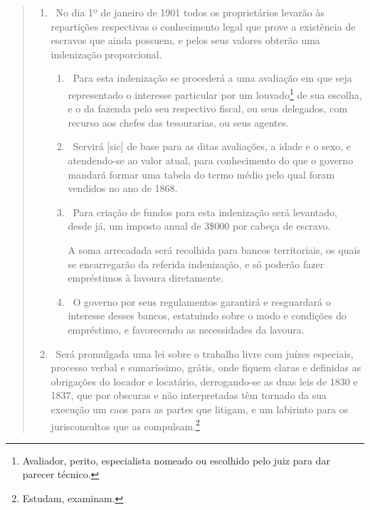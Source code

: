 \begin{quote}
\begin{enumerate}[label=Art. \arabic*º]
\begin{enumerate}[label=§ \arabic*º]
\item\ O proprietário que, dando parte do emancipamento\footnote{O
  mesmo que emancipação.} de um escravo, mostrar que o libertou na pia
batismal, poderá gozar de seus serviços até a idade de 15 anos, sendo,
porém, obrigado a mandar-lhe ensinar, escrever e contar.
\end{enumerate}

\item\ No dia 1º de janeiro de 1901 todos os proprietários levarão às
repartições respectivas o conhecimento legal que prove a existência de
escravos que ainda possuem, e pelos seus valores obterão uma indenização
proporcional.

\begin{enumerate}[label=§ \arabic*º]
\item\ Para esta indenização se procederá a uma avaliação em que seja
representado o interesse particular por um louvado\footnote{Avaliador,
  perito, especialista nomeado ou escolhido pelo juiz para dar parecer
  técnico.} de sua escolha, e o da fazenda pelo seu respectivo fiscal,
ou seus delegados, com recurso aos chefes das tesourarias, ou seus
agentes.

\item\ Servirá {[}sic{]} de base para as ditas avaliações, a idade e o
sexo, e atendendo-se ao valor atual, para conhecimento do que o governo
mandará formar uma tabela do termo médio pelo qual foram vendidos no ano
de 1868.

\item\ Para criação de fundos para esta indenização será levantado, desde
já, um imposto anual de 3\$000 por cabeça de escravo.

A soma arrecadada será recolhida para bancos territoriais, os quais se
encarregarão da referida indenização, e só poderão fazer empréstimos à
lavoura diretamente.

\item\ O governo por seus regulamentos garantirá e resguardará o
interesse desses bancos, estatuindo sobre o modo e condições do
empréstimo, e favorecendo as necessidades da lavoura.
\end{enumerate}

\item\ Será promulgada uma lei sobre o trabalho livre com juízes
especiais, processo verbal e sumaríssimo, grátis, onde fiquem claras e
definidas as obrigações do locador e locatário, derrogando-se as duas
leis de 1830 e 1837, que por obscuras e não interpretadas têm tornado da
sua execução um caos para as partes que litigam, e um labirinto para os
jurisconsultos que as compulsam.\footnote{Estudam, examinam.}


\end{enumerate}
\end{quote}
